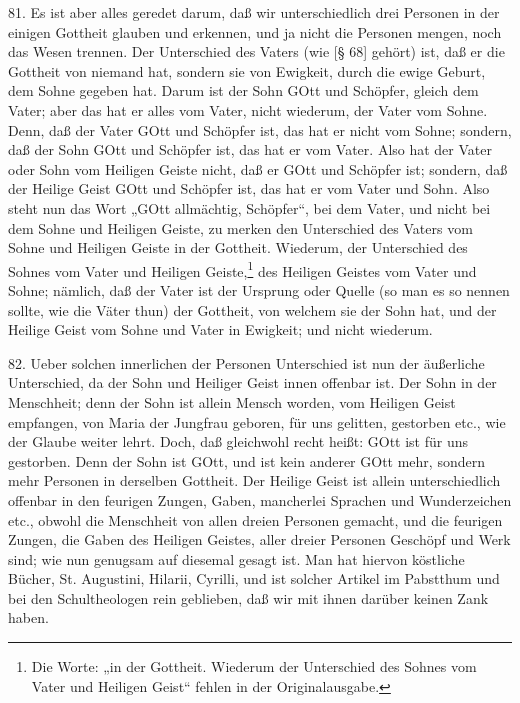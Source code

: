 81. Es ist aber alles geredet darum, daß wir unterschiedlich drei Personen in der einigen Gottheit glauben und erkennen, und ja nicht die Personen mengen, noch das Wesen trennen. Der Unterschied des Vaters (wie [§ 68] gehört) ist, daß er die Gottheit von niemand hat, sondern sie von Ewigkeit, durch die ewige Geburt, dem Sohne gegeben hat. Darum ist der Sohn GOtt und Schöpfer, gleich dem Vater; aber das hat er alles vom Vater, nicht wiederum, der Vater vom Sohne. Denn, daß der Vater GOtt und Schöpfer ist, das hat er nicht vom Sohne; sondern, daß der Sohn GOtt und Schöpfer ist, das hat er vom Vater. Also hat der Vater oder Sohn vom Heiligen Geiste nicht, daß er GOtt und Schöpfer ist; sondern, daß der Heilige Geist GOtt und Schöpfer ist, das hat er vom Vater und Sohn. Also steht nun das Wort „GOtt allmächtig, Schöpfer“, bei dem Vater, und nicht bei dem Sohne und Heiligen Geiste, zu merken den Unterschied des Vaters vom Sohne und Heiligen Geiste in der Gottheit. Wiederum, der Unterschied des Sohnes vom Vater und Heiligen Geiste,\footnote{Die Worte: „in der Gottheit. Wiederum der Unterschied des Sohnes vom Vater und Heiligen Geist“ fehlen in der Originalausgabe.} des Heiligen Geistes vom Vater und Sohne; nämlich, daß der Vater ist der Ursprung oder Quelle (so man es so nennen sollte, wie die Väter thun) der Gottheit, von welchem sie der Sohn hat, und der Heilige Geist vom Sohne und Vater in Ewigkeit; und nicht wiederum.

82. Ueber solchen innerlichen der Personen Unterschied ist nun der äußerliche Unterschied, da der Sohn und Heiliger Geist innen offenbar ist. Der Sohn in der Menschheit; denn der Sohn ist allein Mensch worden, vom Heiligen Geist empfangen, von Maria der Jungfrau geboren, für uns gelitten, gestorben etc., wie der Glaube weiter lehrt. Doch, daß gleichwohl recht heißt: GOtt ist für uns gestorben. Denn der Sohn ist GOtt, und ist kein anderer GOtt mehr, sondern mehr Personen in derselben Gottheit. Der Heilige Geist ist allein unterschiedlich offenbar in den feurigen Zungen, Gaben, mancherlei Sprachen und Wunderzeichen etc., obwohl die Menschheit von allen dreien Personen gemacht, und die feurigen Zungen, die Gaben des Heiligen Geistes, aller dreier Personen
Geschöpf und Werk sind; wie nun genugsam auf diesemal gesagt ist. Man hat hiervon köstliche Bücher, St. Augustini, Hilarii, Cyrilli, und ist solcher Artikel im Pabstthum und bei den Schultheologen rein geblieben, daß wir mit ihnen darüber keinen Zank haben.

